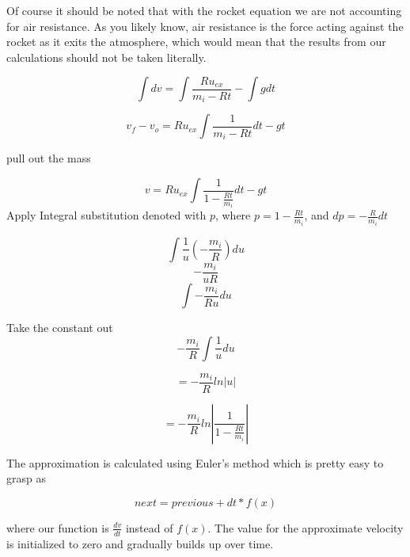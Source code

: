 \documentclass[11pt]{article}
\begin{document}
Of course it should be noted that with the rocket equation we are not accounting for air resistance. As you likely know, air resistance is the force acting against the rocket as it exits the atmosphere, which would mean that the results from our calculations should not be taken literally.

\begin{equation}
\int{dv} = \int{\frac{Ru_{ex}}{m_i-Rt}} - \int{g dt}
\end{equation}

\begin{equation}
v_f-v_o = Ru_{ex}\int{\frac{1}{m_i-Rt}}dt - gt
\end{equation}

pull out the mass

\begin{equation}
v = Ru_{ex}\int{\frac{1}{1-\frac{Rt}{m_i}}}dt - gt
\end{equation}
Apply Integral substitution denoted with $p$, where
$p = 1-\frac{Rt}{m_i}$, and
$dp = - \frac{R}{m_i}dt$

\begin{equation}
\int{\frac{1}{u}(-\frac{m_i}{R})du}
\end{equation}
\begin{equation}
- \frac{m_i}{uR}
\end{equation}
\begin{equation}
\int{-\frac{m_i}{Ru} du}
\end{equation}

Take the constant out
\begin{equation}
-\frac{m_i}{R} \int{\frac{1}{u}du}
\end{equation}

\begin{equation}
= -\frac{m_i}{R}ln|u|
\end{equation}

\begin{equation}
= -\frac{m_i}{R}ln|\frac{1}{1-\frac{Rt}{m_i}}|
\end{equation}

The approximation is calculated using Euler's method which is pretty easy to grasp as

\begin{equation}
next = previous + dt * f(x)
\end{equation}

\noindent where our function is $\frac{dv}{dt}$ instead of $f(x)$. The value for the approximate velocity is initialized to zero and gradually builds up over time.
\end{document}
